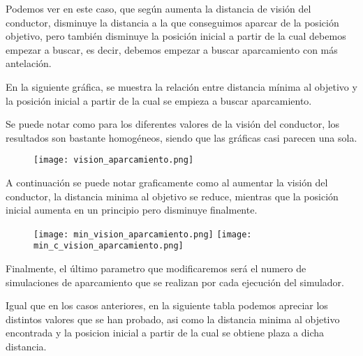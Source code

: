 Podemos ver en este caso, que según aumenta la distancia de visión del conductor, disminuye la distancia a la que conseguimos aparcar de la posición objetivo, pero también disminuye la posición inicial a partir de la cual debemos empezar a buscar, es decir, debemos empezar a buscar aparcamiento con más antelación.

En la siguiente gráfica, se muestra la relación entre distancia mínima al objetivo y la posición inicial a partir de la cual se empieza a buscar aparcamiento.

Se puede notar como para los diferentes valores de la visión del conductor, los resultados son bastante homogéneos, siendo que las gráficas casi parecen una sola.

\begin{figure}[h]
\texttt{[image: vision\_aparcamiento.png]}
\centering
\end{figure}

\newpage

A continuación se puede notar graficamente como al aumentar la visión del conductor, la distancia minima al objetivo se reduce, mientras que la posición inicial aumenta en un principio pero disminuye finalmente.
\begin{figure}[h]
\texttt{[image: min\_vision\_aparcamiento.png]}
\texttt{[image: min\_c\_vision\_aparcamiento.png]}
\centering
\end{figure}

\newpage

Finalmente, el último parametro que modificaremos será el numero de simulaciones de aparcamiento que se realizan por cada ejecución del simulador.

Igual que en los casos anteriores, en la siguiente tabla podemos apreciar los distintos valores que se han probado, asi como la distancia minima al objetivo encontrada y la posicion inicial a partir de la cual se obtiene plaza a dicha distancia.

\begin{table}[h]
\centering
{}
\end{table}

